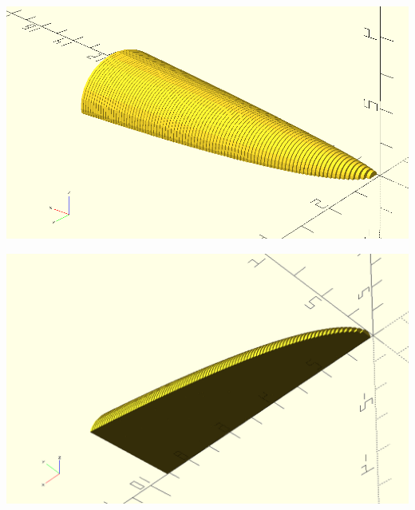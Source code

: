 \documentclass[letterpaper]{article}
\begin{document}
\begin{center}
\includegraphics[width=.9\linewidth]{KBe21math401retCrossSectionSolidFinalB2.png}
\end{center}

\begin{center}
\includegraphics[width=.9\linewidth]{KBe21math401retCrossSectionSolidFinalB3.png}
\end{center}
\end{document}
